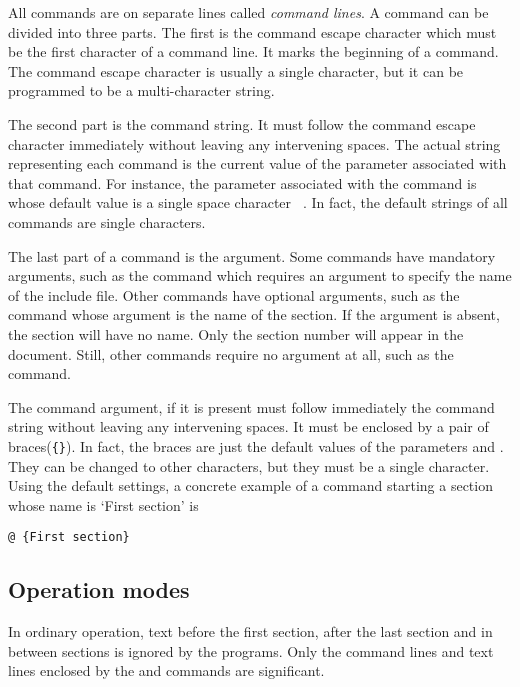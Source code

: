 All commands are on separate lines called {\it command lines\/}.
A command can be divided into three parts. The first is the command
escape character which must be the first character 
of a command line. It marks the beginning of a command. The command
escape character is usually a single character, but it can be
programmed to be a multi-character string.

The second part is the command string. It must follow the command
escape character immediately without leaving any intervening spaces.
The actual string representing each command is the current value of
the parameter associated with that command. For instance, the
parameter associated with the  command is
 whose default value is a single space character
\verb*| |. In fact, the default strings of all commands are single
characters.

The last part of a command is the argument. Some commands have
mandatory arguments, such as the  command which requires
an argument to specify the name of the include file. Other commands
have optional arguments, such as the  command whose
argument is the name of the section. If the argument is absent, the
section will have no name. Only the section number will appear in the
document. Still, other commands require no argument at all, such as
the  command.

The command argument, if it is present must follow immediately the
command string without leaving any intervening spaces. It must be
enclosed by a pair of braces(\verb|{}|). In fact, the braces are just
the default values of the parameters  and
. They can be changed to other characters, but they
must be a single character. Using the default settings, a concrete
example of a command starting a 
section whose name is `First section' is
\begin{verbatim}
@ {First section}
\end{verbatim}

\subsection{Operation modes}\label{sec-modes}

In ordinary operation, text before the first section, after the last
section and in between sections is ignored by the programs. Only the
command lines and text lines enclosed by  the  and
 commands are significant.

